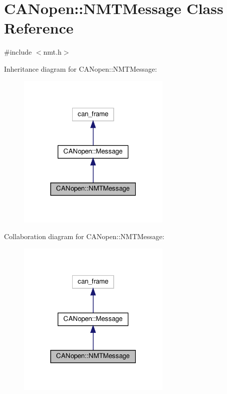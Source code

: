 \hypertarget{class_c_a_nopen_1_1_n_m_t_message}{}\section{C\+A\+Nopen\+:\+:N\+M\+T\+Message Class Reference}
\label{class_c_a_nopen_1_1_n_m_t_message}


{\ttfamily \#include $<$nmt.\+h$>$}



Inheritance diagram for C\+A\+Nopen\+:\+:N\+M\+T\+Message\+:\nopagebreak
\begin{figure}[H]
\begin{center}
\leavevmode
\includegraphics[width=207pt]{class_c_a_nopen_1_1_n_m_t_message__inherit__graph}
\end{center}
\end{figure}


Collaboration diagram for C\+A\+Nopen\+:\+:N\+M\+T\+Message\+:\nopagebreak
\begin{figure}[H]
\begin{center}
\leavevmode
\includegraphics[width=207pt]{class_c_a_nopen_1_1_n_m_t_message__coll__graph}
\end{center}
\end{figure}
